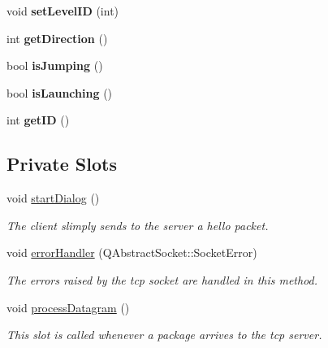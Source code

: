 \begin{DoxyCompactItemize}
\item 
\hypertarget{classClient_a517acd64db1747f6d522d282aea72518}{
void {\bfseries setLevelID} (int)}
\label{classClient_a517acd64db1747f6d522d282aea72518}

\item 
\hypertarget{classClient_add2fe55f478137671b462bf03c1bcfc8}{
int {\bfseries getDirection} ()}
\label{classClient_add2fe55f478137671b462bf03c1bcfc8}

\item 
\hypertarget{classClient_a40a02d7edc873f2b8d6c3aa1c8359711}{
bool {\bfseries isJumping} ()}
\label{classClient_a40a02d7edc873f2b8d6c3aa1c8359711}

\item 
\hypertarget{classClient_a190f2c5c7b640550e619371f2834a338}{
bool {\bfseries isLaunching} ()}
\label{classClient_a190f2c5c7b640550e619371f2834a338}

\item 
\hypertarget{classClient_a4bd5f5f9f09c0667e5cf4491f7099c4a}{
int {\bfseries getID} ()}
\label{classClient_a4bd5f5f9f09c0667e5cf4491f7099c4a}

\end{DoxyCompactItemize}
\subsection*{Private Slots}
\begin{DoxyCompactItemize}
\item 
\hypertarget{classClient_aaab399a5a3940a45aafede75dc77ad90}{
void \hyperlink{classClient_aaab399a5a3940a45aafede75dc77ad90}{startDialog} ()}
\label{classClient_aaab399a5a3940a45aafede75dc77ad90}

\begin{DoxyCompactList}\small\item\em The client slimply sends to the server a hello packet. \item\end{DoxyCompactList}\item 
void \hyperlink{classClient_a97e3cafa32f18b690d47046d0b0e5b0d}{errorHandler} (QAbstractSocket::SocketError)
\begin{DoxyCompactList}\small\item\em The errors raised by the tcp socket are handled in this method. \item\end{DoxyCompactList}\item 
void \hyperlink{classClient_ac7dd9cf6756896887ab8b684bea35fe8}{processDatagram} ()
\begin{DoxyCompactList}\small\item\em This slot is called whenever a package arrives to the tcp server. \item\end{DoxyCompactList}\end{DoxyCompactItemize}
